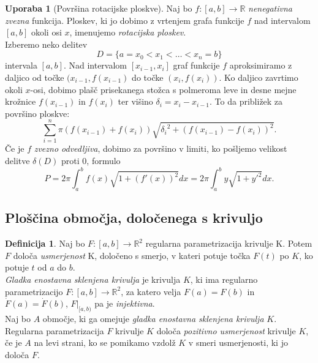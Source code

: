 \documentclass[11pt]{article}
\theoremstyle{definition}
\newtheorem{definicija}{Definicija}[section]
\theoremstyle{definition}
\theoremstyle{definition}
\theoremstyle{theorem}
\newtheorem{uporaba}{Uporaba}[section]
\begin{document}
\begin{uporaba}[Površina rotacijske ploskve]

Naj bo $f:[a, b] \rightarrow \mathbb{R}$ \textit{nenegativna zvezna} funkcija. Ploskev, ki jo dobimo z vrtenjem grafa funkcije $f$ nad intervalom $[a, b]$ okoli osi $x$, imenujemo \textit{rotacijska ploskev}. \\

Izberemo neko delitev
$$D = \{a = x_0 < x_1 < \ldots < x_n = b\}$$
intervala $[a, b]$. Nad intervalom $[x_{i-1}, x_i]$ graf funkcije $f$ aproksimiramo z daljico od točke $(x_{i-1}, f(x_{i-1})$ do točke $(x_i, f(x_i))$. Ko daljico zavrtimo okoli $x$-osi, dobimo plašč prisekanega stožca s polmeroma leve in desne mejne krožnice $f(x_{i-1})$ in $f(x_i)$ ter višino $\delta_i = x_i - x_{i-1}$. To da približek za površino ploskve:
$$\sum_{i=1}^{n} \pi (f(x_{i-1}) + f(x_i)) \sqrt{{\delta_i}^2 + (f(x_{i-1}) - f(x_i))^2}.$$
Če je $f$ \textit{zvezno odvedljiva}, dobimo za površino v limiti, ko pošljemo velikost delitve $\delta(D)$ proti $0$, formulo
$$P = 2 \pi \int_{a}^{b} f(x) \sqrt{1 + (f'(x))^2} dx = 2 \pi \int_{a}^{b} y \sqrt{1 + {y'}^2} dx.$$

\end{uporaba}
\vspace{0.5cm}


\subsection{Ploščina območja, določenega s krivuljo}
\vspace{0.5cm}

\begin{definicija}

Naj bo $F:[a, b] \rightarrow \mathbb{R}^2$ regularna parametrizacija krivulje K. Potem $F$ določa \textit{usmerjenost} K, določeno s smerjo, v kateri potuje točka $F(t)$ po $K$, ko potuje $t$ od $a$ do $b$. \\

\textit{Gladka enostavna sklenjena krivulja} je krivulja $K$, ki ima regularno parametrizacijo $F:[a, b] \rightarrow \mathbb{R}^2$, za katero velja $F(a) = F(b)$ in $\dot{F}(a) = \dot{F}(b)$, $F |_{[a, b)}$ pa je \textit{injektivna}. \\

Naj bo $A$ območje, ki ga omejuje \textit{gladka enostavna sklenjena krivulja} $K$. Regularna parametrizacija $F$ krivulje $K$ določa \textit{pozitivno usmerjenost} krivulje $K$, če je $A$ na levi strani, ko se pomikamo vzdolž $K$ v smeri usmerjenosti, ki jo določa $F$.

\end{definicija}
\vspace{0.5cm}
\end{document}

